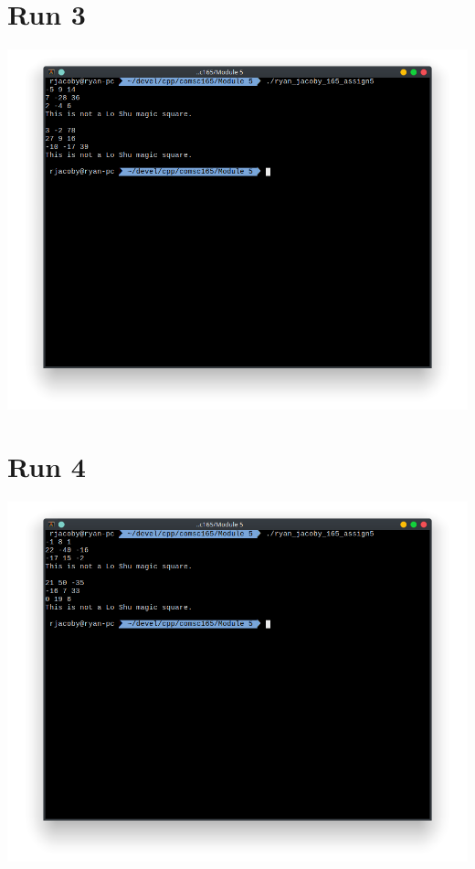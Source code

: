 \documentclass[letterpaper, 11pt]{article}
\begin{document}
\section*{Run 3}
\includegraphics[scale=0.5]{run3.png} \\

\section*{Run 4}
\includegraphics[scale=0.5]{run4.png} \\
\end{document}
